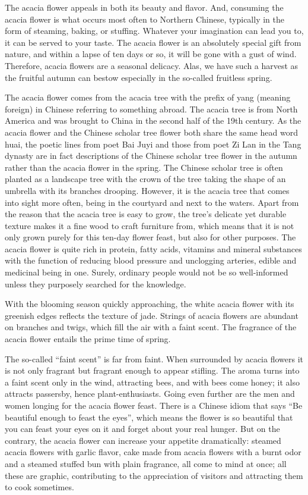 { 	
 	The acacia flower appeals in both its beauty and flavor. And, consuming the acacia flower is what occurs most often to Northern Chinese, typically in the form of steaming, baking, or stuffing. Whatever your imagination can lead you to, it can be served to your taste. The acacia flower is an absolutely special gift from nature, and within a lapse of ten days or so, it will be gone with a gust of wind. Therefore, acacia flowers are a seasonal delicacy. Alas, we have such a harvest as the fruitful autumn can bestow especially in the so-called fruitless spring.
 	
 	The acacia flower comes from the acacia tree with the prefix of yang (meaning foreign) in Chinese referring to something abroad. The acacia tree is from North America and was brought to China in the second half of the 19th century. As the acacia flower and the Chinese scholar tree flower both share the same head word huai, the poetic lines from poet Bai Juyi and those from poet Zi Lan in the Tang dynasty are in fact descriptions of the Chinese scholar tree flower in the autumn rather than the acacia flower in the spring. The Chinese scholar tree is often planted as a landscape tree with the crown of the tree taking the shape of an umbrella with its branches drooping. However, it is the acacia tree that comes into sight more often, being in the courtyard and next to the waters. Apart from the reason that the acacia tree is easy to grow, the tree’s delicate yet durable texture makes it a fine wood to craft furniture from, which means that it is not only grown purely for this ten-day flower feast, but also for other purposes. The acacia flower is quite rich in protein, fatty acids, vitamins and mineral substances with the function of reducing blood pressure and unclogging arteries, edible and medicinal being in one. Surely, ordinary people would not be so well-informed unless they purposely searched for the knowledge.
 	
 	With the blooming season quickly approaching, the white acacia flower with its greenish edges reflects the texture of jade. Strings of acacia flowers are abundant on branches and twigs, which fill the air with a faint scent. The fragrance of the acacia flower entails the prime time of spring.
 	
 	The so-called “faint scent” is far from faint. When surrounded by acacia flowers it is not only fragrant but fragrant enough to appear stifling. The aroma turns into a faint scent only in the wind, attracting bees, and with bees come honey; it also attracts passersby, hence plant-enthusiasts. Going even further are the men and women longing for the acacia flower feast. There is a Chinese idiom that says “Be beautiful enough to feast the eyes”, which means the flower is so beautiful that you can feast your eyes on it and forget about your real hunger. But on the contrary, the acacia flower can increase your appetite dramatically: steamed acacia flowers with garlic flavor, cake made from acacia flowers with a burnt odor and a steamed stuffed bun with plain fragrance, all come to mind at once; all these are graphic, contributing to the appreciation of visitors and attracting them to cook sometimes.
 	
}
